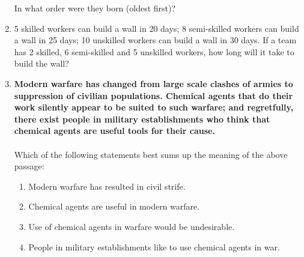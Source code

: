 \documentclass[journal,12pt,onecolumn]{IEEEtran}
\theoremstyle{remark}
\begin{document}
\begin{enumerate}
In what order were they born (oldest first)?

\hfill{}
\begin{enumerate}
 \end{enumerate}

\item 5 skilled workers can build a wall in 20 days; 8 semi-skilled workers can build a wall in 25 days; 10 unskilled workers can build a wall in 30 days. If a team has 2 skilled, 6 semi-skilled and 5 unskilled workers, how long will it take to build the wall?
\hfill{}\begin{enumerate}  \end{enumerate}

\vspace{0.5cm}

\item \textbf{Modern warfare has changed from large scale clashes of armies to suppression of civilian populations. Chemical agents that do their work silently appear to be suited to such warfare; and regretfully, there exist people in military establishments who think that chemical agents are useful tools for their cause.} \\ \\
Which of the following statements best sums up the meaning of the above passage:

\hfill{}
\begin{enumerate}
    \item Modern warfare has resulted in civil strife.
    \item Chemical agents are useful in modern warfare.
    \item Use of chemical agents in warfare would be undesirable.
    \item People in military establishments like to use chemical agents in war.
\end{enumerate}


\end{enumerate}
\end{document}
